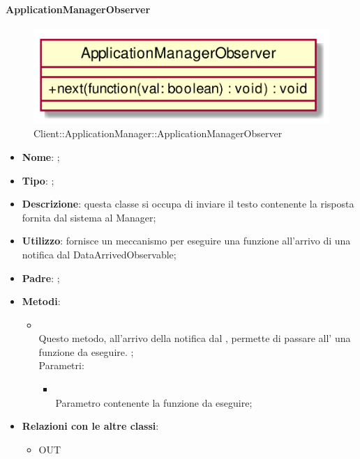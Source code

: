 \hypertarget{ApplicationManagerObserver_label}{\paragraph{ApplicationManagerObserver}}
\begin{figure}[h]
	\centering
	\includegraphics[width=\textwidth,height=\textheight,keepaspectratio]{images/ClassApplicationManagerObserver.png}
	\caption{Client::ApplicationManager::ApplicationManagerObserver}
\end{figure}
\begin{itemize}
	\item \textbf{Nome}: ;
	\item \textbf{Tipo}: ;
	\item \textbf{Descrizione}: questa classe si occupa di inviare il testo contenente la risposta fornita dal sistema al Manager;
	\item \textbf{Utilizzo}: fornisce un meccanismo per eseguire una funzione all'arrivo di una notifica dal DataArrivedObservable;
	\item \textbf{Padre}: ;
	\item \textbf{Metodi}:
	\begin{itemize}
		\item[]  \\
		Questo metodo, all'arrivo della notifica dal , permette di passare all' una funzione da eseguire.
;\\
		Parametri:
		\begin{itemize}
			\item {} \\
			Parametro contenente la funzione da eseguire;
		\end{itemize}
	\end{itemize}
	\item \textbf{Relazioni con le altre classi}:
	\begin{itemize}
		\item OUT \hyperlink{DataArrivedObservable_label}{}
	\end{itemize}
\end{itemize}
\FloatBarrier

